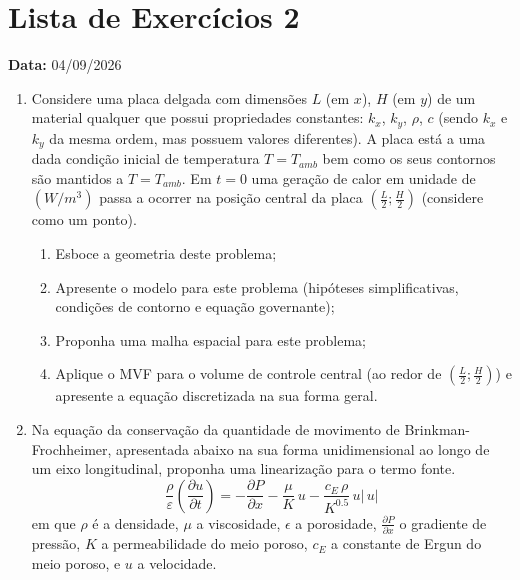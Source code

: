 \section*{Lista de Exercícios 2}

\noindent \textbf{Data:} 04/09/2026

\begin{enumerate}
    \item Considere uma placa delgada com dimensões $L$ (em $x$), $H$ (em $y$) de um material qualquer que possui propriedades constantes: $k_{x}$, $k_{y}$, $\rho$, $c$ (sendo $k_{x}$ e $k_{y}$ da mesma ordem, mas possuem valores diferentes). A placa está a uma dada condição inicial de temperatura $T=T_{amb}$ bem como os seus contornos são mantidos a $T=T_{amb}$. Em $t=0$ uma geração de calor em unidade de $(W/m^{3})$ passa a ocorrer na posição central da placa $\left(\frac{L}{2}; \frac{H}{2}\right)$ (considere como um ponto).
    \begin{enumerate}
        \item Esboce a geometria deste problema;
        \item Apresente o modelo para este problema (hipóteses simplificativas, condições de contorno e equação governante);
        \item Proponha uma malha espacial para este problema;
        \item Aplique o MVF para o volume de controle central (ao redor de $\left(\frac{L}{2}; \frac{H}{2}\right)$) e apresente a equação discretizada na sua forma geral.
    \end{enumerate}

        \item Na equação da conservação da quantidade de movimento de Brinkman-Frochheimer, apresentada abaixo na sua forma unidimensional ao longo de um eixo longitudinal, proponha uma linearização para o termo fonte.
        \begin{equation*}
            \frac{\rho}{\varepsilon}\left(\frac{\partial u}{\partial t}\right) = -\frac{\partial P}{\partial x} - \frac{\mu}{K}\,u - \frac{c_{E}\,\rho}{K^{0.5}}\,u|\,u|
        \end{equation*}
        em que $\rho$ é a densidade, $\mu$ a viscosidade, $\epsilon$ a porosidade, $\frac{\partial P}{\partial x}$ o gradiente de pressão, $K$ a permeabilidade do meio poroso, $c_{E}$ a constante de Ergun do meio poroso, e $u$ a velocidade.
        

\end{enumerate}
